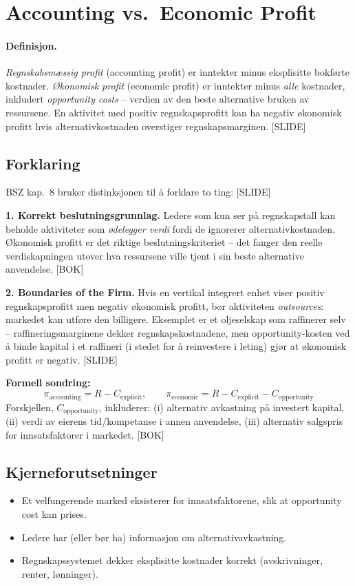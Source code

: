 \section{Accounting vs.\ Economic Profit}\label{thr:accounting-vs-economic-profit}

\paragraph{Definisjon.} \emph{Regnskabsmæssig profit} (accounting profit) er inntekter minus eksplisitte bokførte kostnader. \emph{Økonomisk profit} (economic profit) er inntekter minus \emph{alle} kostnader, inkludert \emph{opportunity costs} -- verdien av den beste alternative bruken av ressursene. En aktivitet med positiv regnskapsprofitt kan ha negativ økonomisk profitt hvis alternativkostnaden overstiger regnskapsmarginen. [SLIDE]

\subsection*{Forklaring}

BSZ kap.\ 8 bruker distinksjonen til å forklare to ting: [SLIDE]

\textbf{1. Korrekt beslutningsgrunnlag.} Ledere som kun ser på regnskapstall kan beholde aktiviteter som \emph{ødelegger verdi} fordi de ignorerer alternativkostnaden. Økonomisk profitt er det riktige beslutningskriteriet -- det fanger den reelle verdiskapningen utover hva ressursene ville tjent i sin beste alternative anvendelse. [BOK]

\textbf{2. Boundaries of the Firm.} Hvis en vertikal integrert enhet viser positiv regnskapsprofitt men negativ økonomisk profitt, bør aktiviteten \emph{outsources}: markedet kan utføre den billigere. Eksemplet er et oljeselskap som raffinerer selv -- raffineringsmarginene dekker regnskapskostnadene, men opportunity-kosten ved å binde kapital i et raffineri (i stedet for å reinvestere i leting) gjør at økonomisk profitt er negativ. [SLIDE]

\textbf{Formell sondring:}
\[
\pi_{\text{accounting}} = R - C_{\text{explicit}}, \qquad
\pi_{\text{economic}} = R - C_{\text{explicit}} - C_{\text{opportunity}}
\]
Forskjellen, $C_{\text{opportunity}}$, inkluderer: (i) alternativ avkastning på investert kapital, (ii) verdi av eierens tid/kompetanse i annen anvendelse, (iii) alternativ salgspris for innsatsfaktorer i markedet. [BOK]

\subsection*{Kjerneforutsetninger}
\begin{itemize}
\item Et velfungerende marked eksisterer for innsatsfaktorene, slik at opportunity cost kan prises.
\item Ledere har (eller bør ha) informasjon om alternativavkastning.
\item Regnskapssystemet dekker eksplisitte kostnader korrekt (avskrivninger, renter, lønninger).
\end{itemize}

